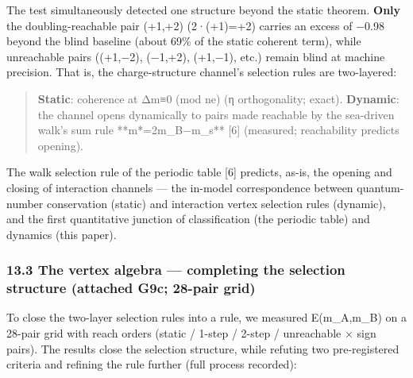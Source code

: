 \documentclass[
]{article}
\begin{document}
The test simultaneously detected one structure beyond the static
theorem. \textbf{Only} the doubling-reachable pair (+1,+2) (2·(+1)=+2)
carries an excess of −0.98 beyond the blind baseline (about 69\% of the
static coherent term), while unreachable pairs ((+1,−2), (−1,+2),
(+1,−1), etc.) remain blind at machine precision. That is, the
charge-structure channel's selection rules are two-layered:

\begin{quote}
\textbf{Static}: coherence at Δm≡0 (mod ne) (η orthogonality; exact).
\textbf{Dynamic}: the channel opens dynamically to pairs made reachable
by the sea-driven walk's sum rule **m*=2m\_B−m\_s** {[}6{]} (measured;
reachability predicts opening).
\end{quote}

The walk selection rule of the periodic table {[}6{]} predicts, as-is,
the opening and closing of interaction channels --- the in-model
correspondence between quantum-number conservation (static) and
interaction vertex selection rules (dynamic), and the first quantitative
junction of classification (the periodic table) and dynamics (this
paper).

\subsubsection{13.3 The vertex algebra --- completing the selection
structure (attached G9c; 28-pair
grid)}\label{the-vertex-algebra-completing-the-selection-structure-attached-g9c-28-pair-grid}

To close the two-layer selection rules into a rule, we measured
E(m\_A,m\_B) on a 28-pair grid with reach orders (static / 1-step /
2-step / unreachable × sign pairs). The results close the selection
structure, while refuting two pre-registered criteria and refining the
rule further (full process recorded):
\end{document}
